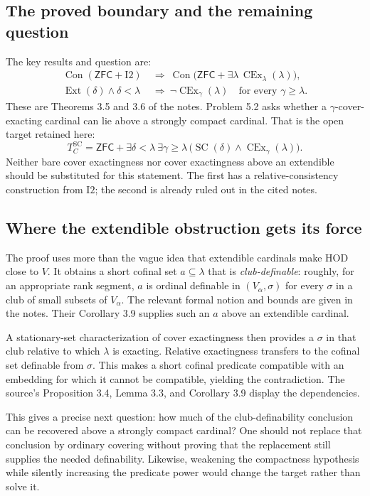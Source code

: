 \documentclass[11pt,letterpaper]{article}
\theoremstyle{definition}
\newcommand{\ZFC}{\mathsf{ZFC}}
\newcommand{\Ext}{\operatorname{Ext}}
\newcommand{\SC}{\operatorname{SC}}
\newcommand{\CEx}{\operatorname{CEx}}
\newcommand{\Con}{\operatorname{Con}}
\newcommand{\Itwo}{\mathrm{I2}}
\begin{document}
\subsection{The proved boundary and the remaining question}

The key results and question are:
\begin{align*}
 \Con(\ZFC+\Itwo)&\ \Longrightarrow\
 \Con\bigl(\ZFC+\exists\lambda\,\CEx_\lambda(\lambda)\bigr),\\
 \Ext(\delta)\wedge\delta<\lambda&\ \Longrightarrow\
 \neg\CEx_\gamma(\lambda)\quad\text{for every }\gamma\geq\lambda.
\end{align*}
These are Theorems 3.5 and 3.6 of the notes. Problem 5.2 asks whether a $\gamma$-cover-exacting cardinal can lie above a strongly compact cardinal. That is the open target retained here:
\[
 T_C^{\mathrm{SC}}=
 \ZFC+\exists\delta<\lambda\ \exists\gamma\geq\lambda\,
       \bigl(\SC(\delta)\wedge\CEx_\gamma(\lambda)\bigr).
\]
Neither bare cover exactingness nor cover exactingness above an extendible should be substituted for this statement. The first has a relative-consistency construction from $\Itwo$; the second is already ruled out in the cited notes. \cite{cover}

\subsection{Where the extendible obstruction gets its force}

The proof uses more than the vague idea that extendible cardinals make HOD close to $V$. It obtains a short cofinal set $a\subseteq\lambda$ that is \emph{club-definable}: roughly, for an appropriate rank segment, $a$ is ordinal definable in $(V_\alpha,\sigma)$ for every $\sigma$ in a club of small subsets of $V_\alpha$. The relevant formal notion and bounds are given in the notes. Their Corollary 3.9 supplies such an $a$ above an extendible cardinal. \cite{cover}

A stationary-set characterization of cover exactingness then provides a $\sigma$ in that club relative to which $\lambda$ is exacting. Relative exactingness transfers to the cofinal set definable from $\sigma$. This makes a short cofinal predicate compatible with an embedding for which it cannot be compatible, yielding the contradiction. The source's Proposition 3.4, Lemma 3.3, and Corollary 3.9 display the dependencies. \cite{cover}

This gives a precise next question: how much of the club-definability conclusion can be recovered above a strongly compact cardinal? One should not replace that conclusion by ordinary covering without proving that the replacement still supplies the needed definability. Likewise, weakening the compactness hypothesis while silently increasing the predicate power would change the target rather than solve it.
\end{document}
